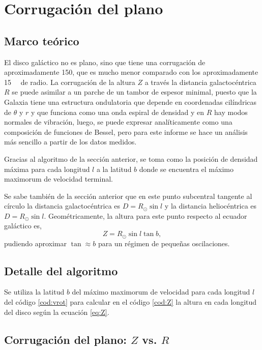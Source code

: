 \section{Corrugación del plano}

\subsection{Marco teórico}

El disco galáctico no es plano, sino que tiene una corrugación de aproximadamente \SI{150}{\parsec}, que es mucho menor comparado con los aproximadamente \SI{15}{\kilo\parsec} de radio. La corrugación de la altura $Z$ a través la distancia galactocéntrica $R$ se puede asimilar a un parche de un tambor de espesor minimal, puesto que la Galaxia tiene una estructura ondulatoria que depende en coordenadas cilíndricas de $\theta$ y $r$ y que funciona como una onda espiral de densidad y en $R$ hay modos normales de vibración, luego, se puede expresar analíticamente como una composición de funciones de Bessel, pero para este informe se hace un análisis más sencillo a partir de los datos medidos.

Gracias al algoritmo de la sección anterior, se toma como la posición de densidad máxima para cada longitud $l$ a la latitud $b$ donde se encuentra el máximo maximorum de velocidad terminal.

Se sabe también de la sección anterior que en este punto subcentral tangente al círculo la distancia galactocéntrica es $D=R_\odot\sin l$ y la distancia heliocéntrica es $D=R_\odot\sin l$. Geométricamente, la altura para este punto respecto al ecuador galáctico es,
\begin{equation}
Z=R_\odot\sin l\tan b
,\label{eq:Z}\end{equation}
pudiendo aproximar $\tan\approx b$ para un régimen de pequeñas oscilaciones.

\subsection{Detalle del algoritmo}

Se utiliza la latitud $b$ del máximo maximorum de velocidad para cada longitud $l$ del código \ref{cod:vrot} para calcular en el código \ref{cod:Z} la altura en cada longitud del disco según la ecuación \ref{eq:Z}. 

\subsection{Corrugación del plano: $Z$ vs. $R$}

